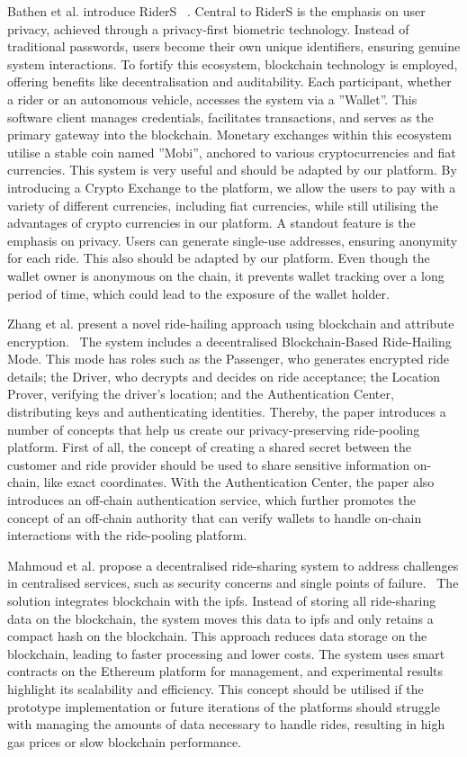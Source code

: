 Bathen et al. introduce RiderS ~\cite{Bathen.}. Central to RiderS is the emphasis on user privacy, achieved through a privacy-first biometric technology. Instead of traditional passwords, users become their own unique identifiers, ensuring genuine system interactions. To fortify this ecosystem, blockchain technology is employed, offering benefits like decentralisation and auditability. Each participant, whether a rider or an autonomous vehicle, accesses the system via a ''Wallet''. This software client manages credentials, facilitates transactions, and serves as the primary gateway into the blockchain. Monetary exchanges within this ecosystem utilise a stable coin named ''Mobi'', anchored to various cryptocurrencies and fiat currencies. This system is very useful and should be adapted by our platform. By introducing a Crypto Exchange to the platform, we allow the users to pay with a variety of different currencies, including fiat currencies, while still utilising the advantages of crypto currencies   in our platform. A standout feature is the emphasis on privacy. Users can generate single-use addresses, ensuring anonymity for each ride. This also should be adapted by our platform. Even though the wallet owner is anonymous on the chain, it prevents wallet tracking over a long period of time, which could lead to the exposure of the wallet holder.

Zhang et al. present a novel ride-hailing approach using blockchain and attribute encryption.~\cite{Zhang.} The system includes a decentralised Blockchain-Based Ride-Hailing Mode. This mode has roles such as the Passenger, who generates encrypted ride details; the Driver, who decrypts and decides on ride acceptance; the Location Prover, verifying the driver's location; and the Authentication Center, distributing keys and authenticating identities. Thereby, the paper introduces a number of concepts that help us create our privacy-preserving ride-pooling platform. First of all, the concept of creating a shared secret between the customer and ride provider should be used  to share sensitive information on-chain, like exact coordinates. With the  Authentication Center, the paper also introduces an off-chain authentication service, which further promotes the concept of an off-chain authority that can verify  wallets to handle on-chain interactions with the ride-pooling platform.

Mahmoud et al.  propose a decentralised ride-sharing system to address challenges in centralised services, such as security concerns and single points of failure.~\cite{Mahmoud.2022}  The solution integrates blockchain with the \gls{ipfs}. Instead of storing all ride-sharing data on the blockchain, the system moves this data to \gls{ipfs} and only retains a compact hash on the blockchain. This approach reduces data storage on the blockchain, leading to faster processing and lower costs. The system uses smart contracts on the Ethereum platform for management, and experimental results highlight its scalability and efficiency. This concept should be utilised if the prototype implementation or future iterations of the platforms should struggle with managing the amounts of data necessary to handle rides, resulting in high gas prices or slow blockchain performance.


